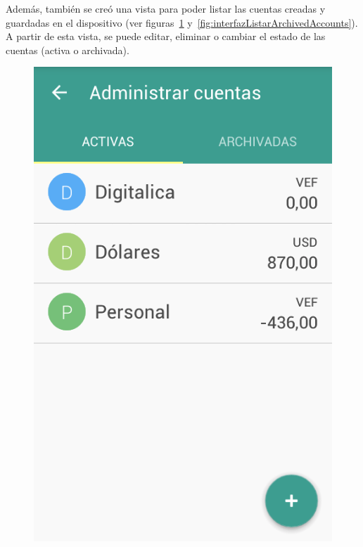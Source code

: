 Además, también se creó una vista para poder listar las cuentas creadas y guardadas en el dispositivo (ver figuras~\ref{fig:interfazListarActiveAccounts} y~\ref{fig:interfazListarArchivedAccounts}). A partir de esta vista, se puede editar, eliminar o cambiar el estado de las cuentas (activa o archivada).


\begin{figure}[ht]
\centering
\begin{minipage}{.5\textwidth}
  \centering
  \includegraphics[scale=0.4,type=png,ext=.png,read=.png]{imagenes/active_accounts}
  \captionsetup{justification=centering}
  \label{fig:interfazListarActiveAccounts}
\end{minipage}%

\end{figure}
